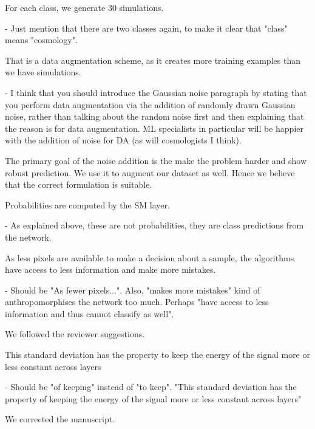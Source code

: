 \documentclass[12pt,a4paper]{article}
\newcommand{\nati}[1]{{\color[rgb]{.1,.6,.1}{NP: #1}}}
\newcommand{\todo}[1]{{\color[rgb]{.6,.1,.6}{TODO: #1}}}
\newcommand{\1}{\b{1}}              %
\newcommand{\0}{\b{0}}              %
\begin{document}
\begin{mdframed}[style=comment] 
For each class, we generate 30 simulations.

- Just mention that there are two classes again, to make it clear that "class" means "cosmology".
\end{mdframed}
\todo{Assign: @Tomek}

\begin{mdframed}[style=comment] 
That is a data augmentation scheme, as it creates more training examples than we have simulations.

- I think that you should introduce the Gaussian noise paragraph by stating that you perform data augmentation via the addition of randomly drawn Gaussian noise, rather than talking about the random noise first and then explaining that the reason is for data augmentation. ML specialists in particular will be happier with the addition of noise for DA (as will cosmologists I think).
\end{mdframed}
\todo{Assign: @all}
\nati{I think that the primary goal of adding noise is the make the problem harder, and show robust prediction, not the make the dataset larger... Hence I disagree with the reviewer. What do you think?}

The primary goal of the noise addition is the make the problem harder and show robust prediction. We use it to augment our dataset as well. Hence we believe that the correct formulation is suitable.

\begin{mdframed}[style=comment] 
Probabilities are computed by the SM layer.

- As explained above, these are not probabilities, they are class predictions from the network.
\end{mdframed}
\todo{Assigned @michael}
\nati{Should we simply say "normalized network score"? I do not know...}

\begin{mdframed}[style=comment] 
As less pixels are available to make a decision about a sample, the algorithms have access to less information and make more mistakes.

- Should be "As fewer pixels...". Also, "makes more mistakes" kind of anthropomorphises the network too much. Perhaps "have access to less information and thus cannot classify as well".
\end{mdframed}
We followed the reviewer suggestions.

\begin{mdframed}[style=comment] 
This standard deviation has the property to keep the energy of the signal more or less constant across layers

- Should be "of keeping" instead of "to keep". "This standard deviation has the property of keeping the energy of the signal more or less constant across layers"
\end{mdframed}
We corrected the manuscript.
\end{document}
